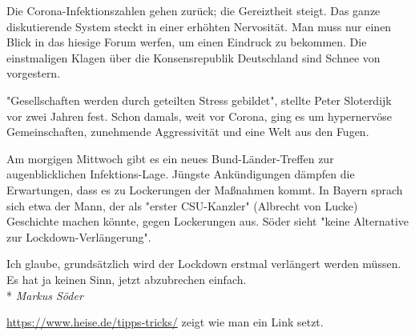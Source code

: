 \documentclass{scrartcl}
\begin{document}
 Die Corona-Infektionszahlen gehen zurück; die Gereiztheit steigt. Das ganze diskutierende System steckt in einer erhöhten Nervosität. Man muss nur einen Blick in das hiesige Forum werfen, um einen Eindruck zu bekommen. Die einstmaligen Klagen über die Konsensrepublik Deutschland sind Schnee von vorgestern.

"Gesellschaften werden durch geteilten Stress gebildet", stellte Peter Sloterdijk vor zwei Jahren fest. Schon damals, weit vor Corona, ging es um hypernervöse Gemeinschaften, zunehmende Aggressivität und eine Welt aus den Fugen.

Am morgigen Mittwoch gibt es ein neues Bund-Länder-Treffen zur augenblicklichen Infektions-Lage. Jüngste Ankündigungen dämpfen die Erwartungen, dass es zu Lockerungen der Maßnahmen kommt. In Bayern sprach sich etwa der Mann, der als "erster CSU-Kanzler" (Albrecht von Lucke) Geschichte machen könnte, gegen Lockerungen aus. Söder sieht "keine Alternative zur Lockdown-Verlängerung".
\\
\begin{addmargin}[25pt]{0pt}
    Ich glaube, grundsätzlich wird der Lockdown erstmal verlängert werden müssen. Es hat ja keinen Sinn, jetzt abzubrechen einfach.
\\*    
 \textit{Markus Söder}   
\\    
\end{addmargin}
\newline
\url{https://www.heise.de/tipps-tricks/} zeigt wie man ein Link setzt.
\end{document}
